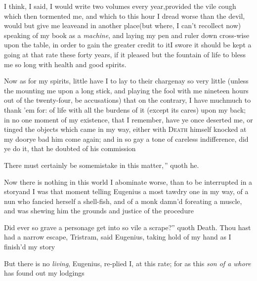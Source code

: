 \documentclass{article}
\begin{document}
\tsh I think, I said, I
would write two volumes every year,\break provided the vile cough which
then tormented me, and which to this hour I dread worse than the
devil, would but give me leave\tsk and in another
place\tsk (but where, I can’t recollect now) speaking of my
book as a \textit{machine}, and laying my pen and ruler down
cross-wise upon the table, in order to gain the greater credit to
it\tsk I swore it should be kept a going at that rate these forty
years, if it pleased but the fountain of life to bless me so long
with health and good spirits.

Now as for my spirits, little have I to lay to their
charge\tsk nay so very little (unless the mounting me upon a long
stick, and playing the fool with me nineteen hours out of the
twenty-four, be accusations) that on the contrary, I have
much\tsk much to thank ’em for:\break 
{}
of life with all the burdens of it (except its
cares) upon my back; in no one moment of my existence, that I
remember, have ye once deserted me, or tinged the objects which
came in my way, either with
\textsc{Death} himself knocked at my door\tsk ye bad him
come again; and in so gay a tone of careless indifference, did ye
do it, that he doubted of his commission\tsh

\indent\lqq\tsh There must certainly be some\break\lqq mistake in this
matter,\,” quoth he.

Now there is nothing in this world I abominate worse, than to be
interrupted in a story\tsh and I was that moment telling
Eugenius a most tawdry one in my way, of a nun who fancied
herself a shell-fish, and of a monk damn’d for\break eating a
muscle, and was shewing him the grounds and justice of the
procedure\tsh{}

\lqq\tsk Did ever so grave a personage\break
\lqq get into so vile a scrape?” quoth\break
Death. Thou hast had a narrow escape,
Tristram, said Eugenius, taking hold of my hand as I
finish’d my story\tsh

But there is no \textit{living}, Eugenius, re-\break plied I, at this
rate; for as this \textit{son of a whore} has found out my
lodgings\tsh
\end{document}

